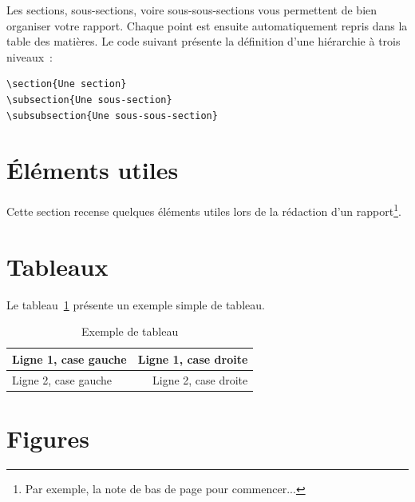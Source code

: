 \documentclass[twoside,openright,a4paper,11pt,french]{article}
\begin{document}
Les sections, sous-sections, voire sous-sous-sections vous permettent de bien organiser votre rapport.
Chaque point est ensuite automatiquement repris dans la table des matières.
Le code suivant présente la définition d'une hiérarchie à trois niveaux~:
\begin{verbatim}
\section{Une section}
\subsection{Une sous-section}
\subsubsection{Une sous-sous-section}
\end{verbatim}

\section{\'Eléments utiles}
\label{sec:elts}

Cette section recense quelques éléments utiles lors de la rédaction d'un rapport\footnote{Par exemple, la note de bas de page pour commencer...}.

\section{Tableaux}

Le tableau~\ref{tab} présente un exemple simple de tableau.


\begin{table}[h]
  \centering
  \begin{tabular}{| p{5cm} | r |}
    \hline
    Ligne 1, case gauche & Ligne 1, case droite\\
    \hline
    Ligne 2, case gauche & Ligne 2, case droite\\
    \hline
  \end{tabular}
  \caption{Exemple de tableau}
  \label{tab}
\end{table}

\section{Figures}
\end{document}
